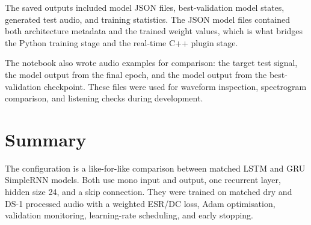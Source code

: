 The saved outputs included model JSON files, best-validation model states, generated test audio, and training statistics. The JSON model files contained both architecture metadata and the trained weight values, which is what bridges the Python training stage and the real-time C++ plugin stage.

The notebook also wrote audio examples for comparison: the target test signal, the model output from the final epoch, and the model output from the best-validation checkpoint. These files were used for waveform inspection, spectrogram comparison, and listening checks during development.

\section{Summary}

The configuration is a like-for-like comparison between matched LSTM and GRU SimpleRNN models. Both use mono input and output, one recurrent layer, hidden size 24, and a skip connection. They were trained on matched dry and DS-1 processed audio with a weighted ESR/DC loss, Adam optimisation, validation monitoring, learning-rate scheduling, and early stopping.
